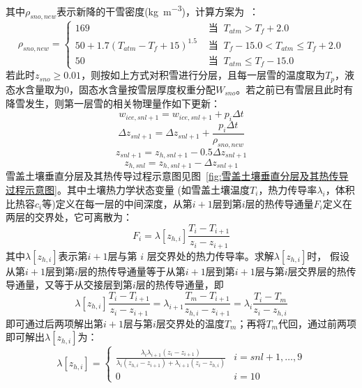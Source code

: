 其中$\rho_{sno,new}$表示新降的干雪密度(\unit{kg.m^{-3}})，计算方案为~\citep{anderson1976point}：
\begin{equation}
\rho_{sno, new}=\begin{cases}
169 & \text { 当 }\ T_{atm}>T_{f}+2.0 \\ 
50+1.7\left(T_{atm}-T_{f}+15\right)^{1.5}  & \text { 当 }\ T_{f}-15.0<T_{atm} \leq T_{f}+2.0 \\ 
50 & \text { 当 }\ T_{atm} \leq T_{f}-15.0
\end{cases}
\end{equation}
若此时$z_{sno} \geq 0.01$，则按如上方式对积雪进行分层，且每一层雪的温度取为$T_p$，液态水含量取为0，固态水含量按雪层厚度权重分配$W_{sno}$。若之前已有雪层且此时有降雪发生，则第一层雪的相关物理量作如下更新：
\begin{equation}
w_{ice, snl+1}=w_{ice, snl+1}+p_{i} \Delta t
\end{equation}
\begin{equation}
\Delta z_{snl+1}=\Delta z_{snl+1}+\frac{p_{i} \Delta t}{\rho_{sno, new}}
\end{equation}
\begin{equation}
z_{snl+1}=z_{h, snl+1}-0.5 \Delta z_{snl+1}
\end{equation}
\begin{equation}
z_{h, snl}=z_{h, snl+1}-\Delta z_{snl+1}
\end{equation}
雪盖土壤垂直分层及其热传导过程示意图见图~\ref{fig:雪盖土壤垂直分层及其热传导过程示意图}。其中土壤热力学状态变量
(如雪盖土壤温度$T_i$，热力传导率$\lambda_i$，体积比热容$c_i$等)定义在每一层的中间深度，从第$i+1$层到第$i$层的热传导通量$F_i$定义在两层的交界处，它可离散为：
\begin{equation}
F_{i}=\lambda\left[z_{h, i}\right] \frac{T_{i}-T_{i+1}}{z_{i}-z_{i+1}}
\end{equation}
其中$\lambda\left[z_{h,i}\right]$表示第$i+1$层与第 $i$ 层交界处的热力传导率。求解$\lambda\left[z_{h,i}\right]$时，
假设从第$i+1$层到第$i$层的热传导通量等于从第$i+1$层到第$i+1$层与第$i$层交界层的热传导通量，又等于从交接层到第$i$层的热传导通量，即
\begin{equation}
\lambda\left[z_{h, i}\right] \frac{T_{i}-T_{i+1}}{z_{i}-z_{i+1}}=\lambda_{i+1} \frac{T_{m}-T_{i+1}}{z_{h, i}-z_{i+1}}=\lambda_{i} \frac{T_{i}-T_{m}}{z_{i}-z_{h, i}}
\end{equation}
即可通过后两项解出第$i+1$层与第$i$层交界处的温度$T_m$；再将$T_m$代回，通过前两项即可解出$\lambda\left[z_{h,i}\right]$为：
\begin{equation}
\lambda\left[z_{h, i}\right]=\begin{cases}
\frac{\lambda_{i} \lambda_{i+1}\left(z_{i}-z_{i+1}\right)}{\lambda_{i}\left(z_{h, i}-z_{i+1}\right)+\lambda_{i+1}\left(z_{i}-z_{h, i}\right)} & i=snl+1, \ldots, 9 \\ 
0 & i=10
\end{cases}
\end{equation}
